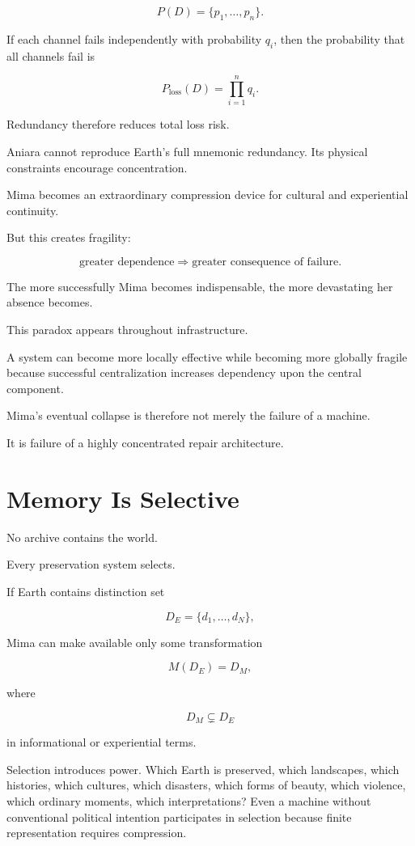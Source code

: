 \documentclass[11pt,oneside]{book}
\theoremstyle{definition}
\theoremstyle{remark}
\begin{document}
\[
P(D)
=
\{p_1,\ldots,p_n\}.
\]

If each channel fails independently with probability \(q_i\), then the probability that all channels fail is

\[
P_{\mathrm{loss}}(D)
=
\prod_{i=1}^{n}q_i.
\]

Redundancy therefore reduces total loss risk.

Aniara cannot reproduce Earth's full mnemonic redundancy. Its physical constraints encourage concentration.

Mima becomes an extraordinary compression device for cultural and experiential continuity.

But this creates fragility:

\[
\text{greater dependence}
\Rightarrow
\text{greater consequence of failure}.
\]

The more successfully Mima becomes indispensable, the more devastating her absence becomes.

This paradox appears throughout infrastructure.

A system can become more locally effective while becoming more globally fragile because successful centralization increases dependency upon the central component.

Mima's eventual collapse is therefore not merely the failure of a machine.

It is failure of a highly concentrated repair architecture.

\section{Memory Is Selective}

No archive contains the world.

Every preservation system selects.

If Earth contains distinction set

\[
D_E
=
\{d_1,\ldots,d_N\},
\]

Mima can make available only some transformation

\[
M(D_E)
=
D_M,
\]

where

\[
D_M\subsetneq D_E
\]

in informational or experiential terms.

Selection introduces power. Which Earth is preserved, which landscapes, which histories, which cultures, which disasters, which forms of beauty, which violence, which ordinary moments, which interpretations? Even a machine without conventional political intention participates in selection because finite representation requires compression.
\end{document}

